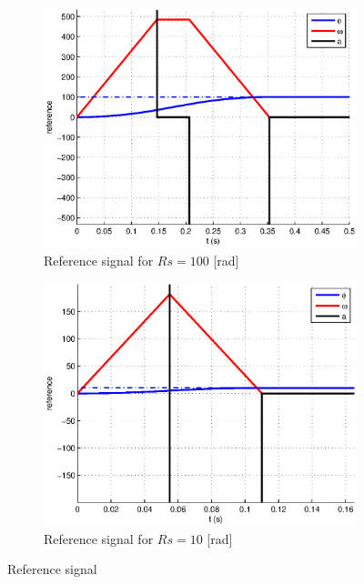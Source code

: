 \begin{figure}[t!p]
  \begin{center}

  \begin{subfigure}[b]{\columnwidth}
  \includegraphics[width = \columnwidth]{fig/trajPlanref100.eps}
  \caption{Reference signal for $Rs = 100$ [rad]}
  \end{subfigure}
  \vspace{\fill}
  \begin{subfigure}[b]{\columnwidth}
  \includegraphics[width = \columnwidth]{fig/trajPlanref10.eps}
  \caption{Reference signal for $Rs = 10$ [rad]}
  \end{subfigure}
\caption{Reference signal}
\label{trajplan}
\end{center}
\end{figure}


